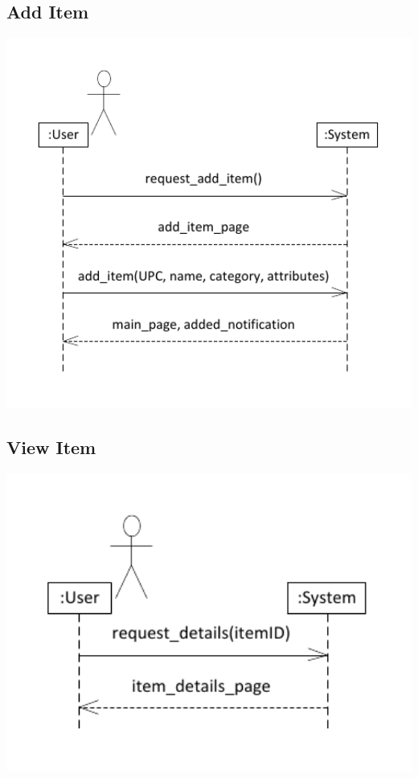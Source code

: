 \documentclass{article}
\begin{document}
\subsection{Add Item}
\includegraphics[keepaspectratio, width=6in]{ssd_add_item.pdf}\\

\subsection{View Item}
\includegraphics[keepaspectratio, width=6in]{ssd_view_item_details.pdf}\\
\end{document}
